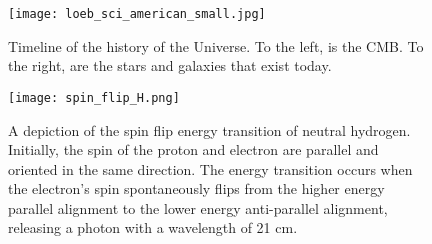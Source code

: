 

\begin{figure}[th]
	\centering
	\texttt{[image: loeb\_sci\_american\_small.jpg]}
	\caption[Epoch of Reionization Timeline]{Timeline of the history of the Universe. To the left, is the CMB. To the right, are the stars and galaxies that exist today.}
	\label{fig:reionization}
\end{figure}

\begin{figure}[th]
	\centering
	\texttt{[image: spin\_flip\_H.png]}
	\caption[Spin-Flip Transition]{A depiction of the spin flip energy transition of neutral hydrogen. Initially,
																					 the spin of the proton and electron are parallel and oriented
																					 in the same direction. The energy transition occurs when the electron's spin spontaneously
																					 flips from the higher energy parallel alignment to the lower energy anti-parallel alignment,
																					 releasing a photon with a wavelength of 21 cm.}
	\label{fig:reionization}
\end{figure}
